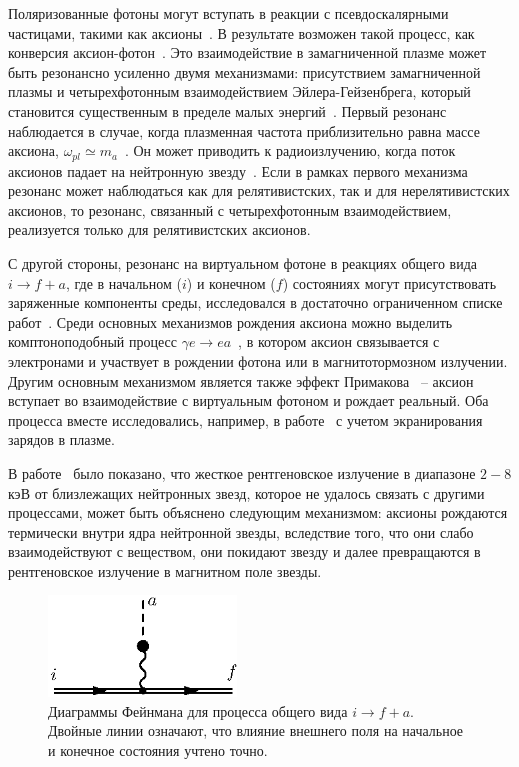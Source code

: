 Поляризованные фотоны могут вступать в реакции с псевдоскалярными частицами, такими как аксионы~\cite{Sikivie:1983}. В результате возможен такой процесс, как конверсия аксион-фотон~\cite{Raffelt:1988}. Это взаимодействие в замагниченной плазме может быть резонансно усиленно двумя механизмами: присутствием замагниченной плазмы и четырехфотонным взаимодействием Эйлера-Гейзенбрега, который становится существенным в пределе малых энергий~\cite{Lai:2006}. Первый резонанс наблюдается в случае, когда плазменная частота приблизительно равна массе аксиона, $\omega_{pl}\simeq m_a$~\cite{Yanagida:1988}. Он может приводить к радиоизлучению, когда поток аксионов падает на нейтронную звезду~\cite{Pshirkov:2009}. Если в рамках первого механизма резонанс может наблюдаться как для релятивистских, так и для нерелятивистских аксионов, то резонанс, связанный с четырехфотонным взаимодействием, реализуется только для релятивистских аксионов.

С другой стороны, резонанс на виртуальном фотоне в реакциях общего вида $i \to f + a$, где в начальном ($i$) и конечном ($f$) состояниях могут присутствовать заряженные компоненты среды, исследовался в достаточно ограниченном списке работ~\cite{Skobelev:2000,Skobelev:2007,MikhRumShk:09}. Среди основных механизмов рождения аксиона можно выделить комптоноподобный процесс $\gamma e \to e a$~\cite{Skobelev:2000}, в котором аксион связывается с электронами и участвует в рождении фотона или в магнитотормозном излучении. Другим основным механизмом является также эффект Примакова~\cite{Primakoff:1951} -- аксион вступает во взаимодействие с виртуальным фотоном и рождает реальный. Оба процесса вместе исследовались, например, в работе~\cite{Raffelt:1996} с учетом экранирования зарядов в плазме.

В работе~\cite{Buschmann:2021} было показано, что жесткое рентгеновское 
излучение в диапазоне $2-8$ кэВ от близлежащих нейтронных звезд, которое не 
удалось связать с другими процессами, может быть объяснено следующим 
механизмом: аксионы рождаются термически внутри ядра нейтронной звезды, 
вследствие того, что они слабо взаимодействуют с веществом, они покидают звезду 
и далее превращаются в рентгеновское излучение в магнитном поле звезды.

%
\begin{figure}
\centerline{\includegraphics[width=5cm]{fig5_1.eps}}
\caption{Диаграммы Фейнмана для процесса общего вида $i \to 
f+a$. Двойные линии означают, что влияние внешнего поля на начальное и 
конечное состояния учтено точно.}
\label{fig:Diagaxion}
\end{figure}


